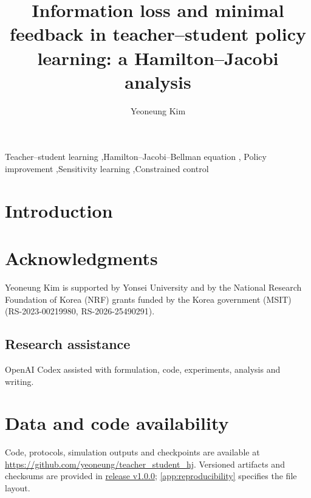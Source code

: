\documentclass[preprint,11pt]{elsarticle}
\begin{document}
\begin{frontmatter}
\title{Information loss and minimal feedback in teacher--student policy learning: a Hamilton--Jacobi analysis}
\author{Yeoneung Kim}
\address{Department of Industrial Engineering, College of Engineering, Yonsei University, 50 Yonsei-ro, Seodaemun-gu, Seoul 03722, Republic of Korea}
\begin{abstract}\end{abstract}
\begin{keyword}
Teacher--student learning \sep Hamilton--Jacobi--Bellman equation \sep
Policy improvement \sep Sensitivity learning \sep Constrained control
\end{keyword}
\end{frontmatter}
\clearpage
\section{Introduction}









\section*{Acknowledgments}
Yeoneung Kim is supported by Yonsei University and by the National Research
Foundation of Korea (NRF) grants funded by the Korea government (MSIT)
(RS-2023-00219980, RS-2026-25490291).
\begin{samepage}
\section*{Research assistance}
OpenAI Codex assisted with formulation, code, experiments, analysis and writing.
\end{samepage}
\section*{Data and code availability}
Code, protocols, simulation outputs and checkpoints are available at
\url{https://github.com/yeoneung/teacher_student_hj}.
Versioned artifacts and checksums are provided in
\href{https://github.com/yeoneung/teacher_student_hj/releases/tag/v1.0.0}{release v1.0.0};
\ref{app:reproducibility} specifies the file layout.
\appendix
\end{document}

